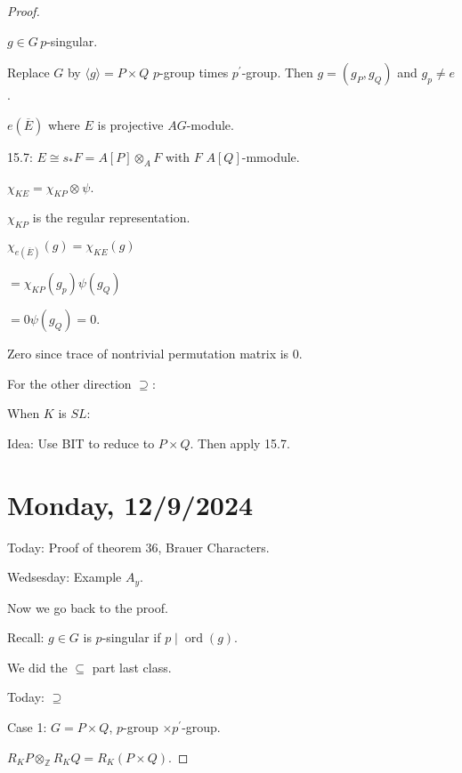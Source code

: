 \documentclass{article}
\theoremstyle{definition}
\begin{document}
\begin{proof}
    \begin{center}
    \end{center}

    \(g\in G\,p\)-singular.
    
    Replace \(G\) by \(\langle g \rangle = P \times Q\) \(p\)-group times \(p^{\prime}\)-group. Then \(g = (g_P, g_Q)\) and \(g_p \neq e\).

    \(e(\overline{E})\) where \(E\) is projective \(AG\)-module.
    
    15.7: \(E \cong s_{\ast} F = A[P] \otimes_A F\) with \(F\) \(A[Q]\)-mmodule.

    \(\chi_{KE} = \chi_{KP} \otimes_{} \psi\).

    \(\chi_{KP}\) is the regular representation.

    \(\chi_{e(\overline{E})}(g) = \chi_{KE}(g)\) 

    \(= \chi_{KP}(g_p)\psi(g_Q)\)

    \(= 0 \psi (g_Q) = 0\).

    Zero since trace of nontrivial permutation matrix is \(0\).

    For the other direction \(\supseteq:\) 

    When \(K\) is \(SL\):

    Idea: Use BIT to reduce to \(P \times Q\). Then apply 15.7.

\section*{Monday, 12/9/2024}

Today: Proof of theorem 36, Brauer Characters.

Wedsesday: Example \(A_y\).

Now we go back to the proof.

    Recall: \(g\in G\) is \(p\)-singular if \(p\mid \operatorname{ord} (g)\).

    We did the \(\subseteq\) part last class.

    Today: \(\supseteq \) 

    Case 1: \(G = P \times Q\), \(p\)-group \(\times p^{\prime}\)-group.

    \(R_K P \otimes_{\mathbb{Z}} R_K Q = R_K(P \times Q)\).


\end{proof}
\end{document}
